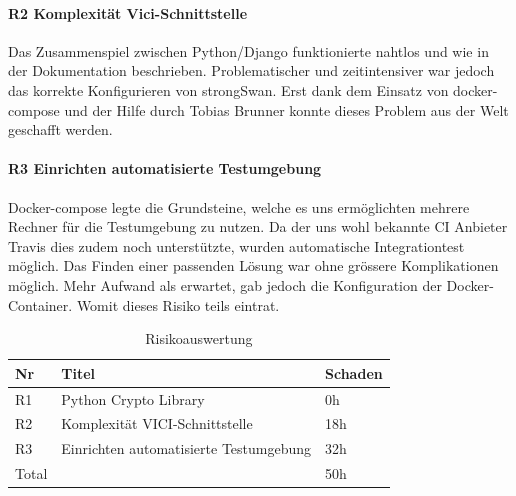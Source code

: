 \paragraph{R2 Komplexität Vici-Schnittstelle} Das Zusammenspiel zwischen Python/Django funktionierte nahtlos und wie in der Dokumentation beschrieben. Problematischer und zeitintensiver war jedoch das korrekte Konfigurieren von strongSwan. Erst dank dem Einsatz von docker-compose und der Hilfe durch Tobias Brunner konnte dieses Problem aus der Welt geschafft werden.

\paragraph{R3 Einrichten automatisierte Testumgebung}
Docker-compose legte die Grundsteine, welche es uns ermöglichten mehrere Rechner für die Testumgebung zu nutzen. Da der uns wohl bekannte CI Anbieter Travis dies zudem noch unterstützte, wurden automatische Integrationtest möglich. Das Finden einer passenden Lösung war ohne grössere Komplikationen möglich. Mehr Aufwand als erwartet, gab jedoch die Konfiguration der Docker-Container. Womit dieses Risiko teils eintrat.\\
\medskip
\begin{table}[H]
	\centering
    \begin{tabular}{|p{2cm}|l|p{2cm}|}
    \hline    
    \rowcolor{lightblue}
	Nr & Titel & Schaden \\ \hline   
	R1 & Python Crypto Library & 0h \\ \hline
	R2 & Komplexität VICI-Schnittstelle & 18h \\ \hline
	R3 & Einrichten automatisierte Testumgebung & 32h \\ \hline
	\rowcolor{lightblue}
	Total &  & 50h \\ \hline
    \end{tabular}
    \caption[Risikoauswertung]{Risikoauswertung}
\end{table}
